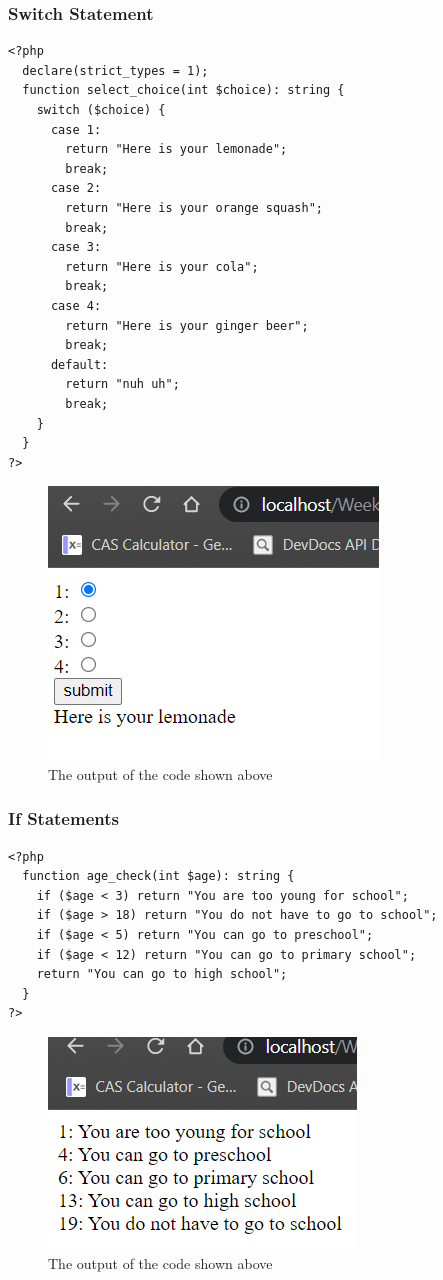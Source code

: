 \documentclass{article}
\begin{document}
        \subsubsection{Switch Statement}
            \begin{verbatim}
<?php
  declare(strict_types = 1);
  function select_choice(int $choice): string {
    switch ($choice) {
      case 1:
        return "Here is your lemonade";
        break;
      case 2:
        return "Here is your orange squash";
        break;
      case 3:
        return "Here is your cola";
        break;
      case 4:
        return "Here is your ginger beer";
        break;
      default:
        return "nuh uh";
        break;
    }
  }
?>
            \end{verbatim}
            \begin{figure}[h]
                \centering
                \includegraphics{SwitchOutput}
                \caption{The output of the code shown above}
            \end{figure}
        \subsubsection{If Statements}
            \begin{verbatim}
<?php
  function age_check(int $age): string {
    if ($age < 3) return "You are too young for school";
    if ($age > 18) return "You do not have to go to school";
    if ($age < 5) return "You can go to preschool";
    if ($age < 12) return "You can go to primary school";
    return "You can go to high school";
  }
?>
            \end{verbatim}
            \begin{figure}[h]
                \centering
                \includegraphics{IfOutput}
                \caption{The output of the code shown above}
            \end{figure}
\end{document}

